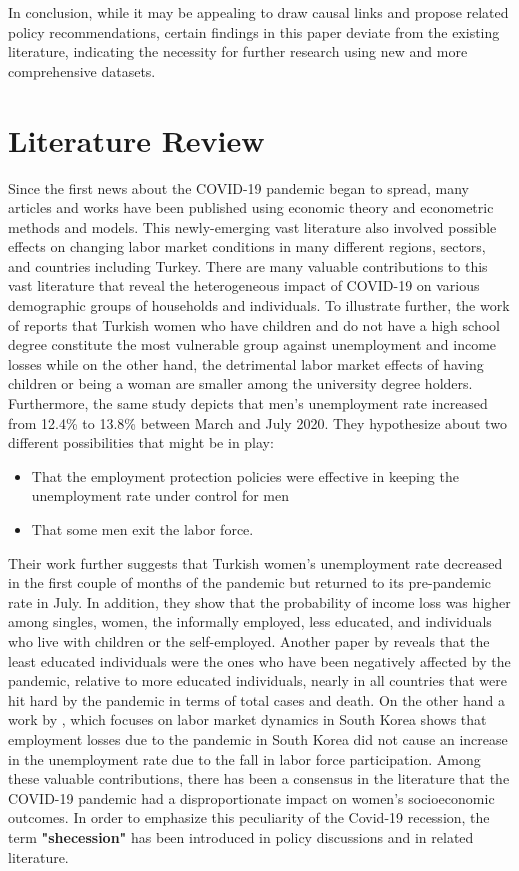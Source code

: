 \documentclass[a4paper,12pt]{article}
\begin{document}
In conclusion, while it may be appealing to draw causal links and propose related policy recommendations, certain findings in this paper deviate from the existing literature, indicating the necessity for further research using new and more comprehensive datasets.





\section{Literature Review}
\indent Since the first news about the COVID-19 pandemic began to spread, many articles and works have been published using economic theory and econometric methods and models. This newly-emerging vast literature also involved possible effects on changing labor market conditions in many different regions, sectors, and countries including Turkey. There are many valuable contributions to this vast literature that reveal the heterogeneous impact of COVID-19 on various demographic groups of households and individuals. To illustrate further, the work of \textbf{\cite{aygun2021}} reports that Turkish women who have children and do not have a high school degree constitute the most vulnerable group against unemployment and income losses while on the other hand, the detrimental labor market effects of having children or being a woman are smaller among the university degree holders. Furthermore, the same study depicts that men’s unemployment rate increased from 12.4\% to 13.8\% between March and July 2020. They hypothesize about two different possibilities that might be in play: 
\begin{itemize}
    \item That the employment protection policies were effective in keeping the unemployment rate under control for men
    \item That some men exit the labor force.
\end{itemize} 

\indent Their work further suggests that Turkish women’s unemployment rate decreased in the first couple of months of the pandemic but returned to its pre-pandemic rate in July. In addition, they show that the probability of income loss was higher among singles, women, the informally employed, less educated, and individuals who live with children or the self-employed. Another paper by \textbf{\cite{aldan2021}} reveals that the least educated individuals were the ones who have been negatively affected by the pandemic, relative to more educated individuals, nearly in all countries that were hit hard by the pandemic in terms of total cases and death. On the other hand a work by \textbf{\cite{aum2021}}, which focuses on labor market dynamics in South Korea shows that employment losses due to the pandemic in South Korea did not cause an increase in the unemployment rate due to the fall in labor force participation. Among these valuable contributions, there has been a consensus in the literature that the COVID-19 pandemic had a disproportionate impact on women’s socioeconomic outcomes. In order to emphasize this peculiarity of the Covid-19 recession, the term \textbf{"shecession"} has been introduced in policy discussions and in related literature.
\end{document}
